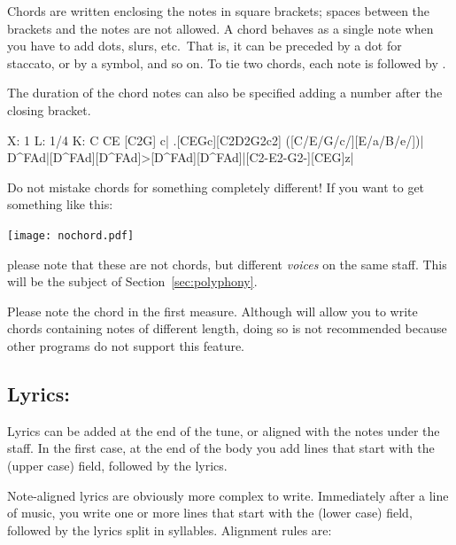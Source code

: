 \documentclass[a4paper,12pt]{book}
\begin{document}
Chords are written enclosing the notes in square brackets; spaces
between the brackets and the notes are not allowed. A chord behaves as
a single note when you have to add dots, slurs, etc.\ That is, it can
be preceded by a dot for staccato, or by a symbol, and so on. To tie
two chords, each note is followed by \car{-}.

The duration of the chord notes can also be specified adding a number
after the closing bracket.

\begin{abcsource}
X: 1
L: 1/4
K: C
CE [C2G] c| .[CEGc][C2D2G2c2] ([C/E/G/c/][E/a/B/e/])|
D^FAd|[D^FAd][D^FAd]>[D^FAd][D^FAd]|[C2-E2-G2-][CEG]z|
\end{abcsource}


\begin{warn}

  Do not mistake chords for something completely different! If you
  want to get something like this:
  
  \texttt{[image: nochord.pdf]}
  
  please note that these are not chords, but different \emph{voices}
  on the same staff. This will be the subject of
  Section~\ref{sec:polyphony}.

\end{warn}

Please note the chord in the first measure. Although \abcm{} will
allow you to write chords containing notes of different length, doing
so is not recommended because other \ABC{} programs do not support
this feature.


\subsection{Lyrics: }
\label{sec:lyrics}

Lyrics can be added at the end of the tune, or aligned with the notes
under the staff. In the first case, at the end of the body you add
lines that start with the  (upper case) field, followed by
the lyrics.

Note-aligned lyrics are obviously more complex to write. Immediately
after a line of music, you write one or more lines that start with the
 (lower case) field, followed by the lyrics split in
syllables. Alignment rules are:
\end{document}
